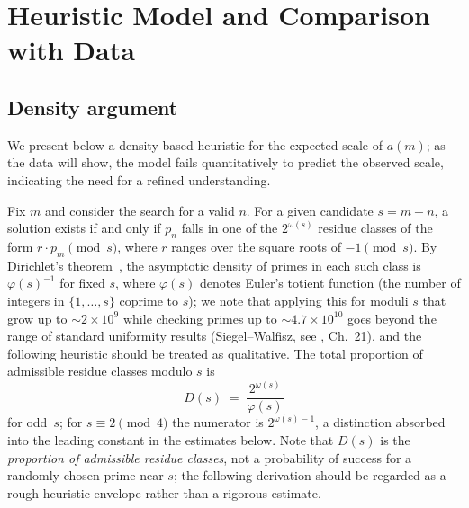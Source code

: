 \documentclass[pdflatex,sn-mathphys-num,Numbered]{sn-jnl}
\theoremstyle{thmstyleone}
\theoremstyle{thmstylethree}
\theoremstyle{thmstyletwo}
\numberwithin{equation}{section}
\begin{document}
\section{Heuristic Model and Comparison with Data}
\label{sec:heuristic}

\subsection{Density argument}
\label{sec:density}

We present below a density-based heuristic for the expected scale
of $a(m)$; as the data will show, the model fails quantitatively
to predict the observed scale, indicating the need for a refined
understanding.

Fix $m$ and consider the search for a valid $n$.
For a given candidate $s = m + n$, a solution exists if and only if
$p_n$ falls in one of the $2^{\omega(s)}$ residue classes of the form
$r \cdot p_m \pmod{s}$, where $r$ ranges over the square roots of
$-1 \pmod{s}$.
By Dirichlet's theorem~\cite{Davenport}, the asymptotic density
of primes in each such class is $\varphi(s)^{-1}$ for fixed $s$,
where $\varphi(s)$ denotes Euler's totient function (the number of
integers in $\{1, \ldots, s\}$ coprime to $s$); we note
that applying this for moduli $s$ that grow up to $\sim 2 \times 10^9$
while checking primes up to $\sim 4.7 \times 10^{10}$ goes beyond the
range of standard uniformity results (Siegel--Walfisz,
see \cite{Davenport}, Ch.~21), and the following heuristic should be
treated as qualitative.
The total proportion of admissible residue classes modulo $s$ is
\[
D(s) \;=\; \frac{2^{\omega(s)}}{\varphi(s)}
\]
for odd~$s$; for $s \equiv 2 \pmod{4}$ the numerator is
$2^{\omega(s)-1}$, a distinction absorbed into the leading constant
in the estimates below.
Note that $D(s)$ is the \emph{proportion of admissible residue classes},
not a probability of success for a randomly chosen prime near $s$;
the following derivation should be regarded as a rough heuristic
envelope rather than a rigorous estimate.
\end{document}
